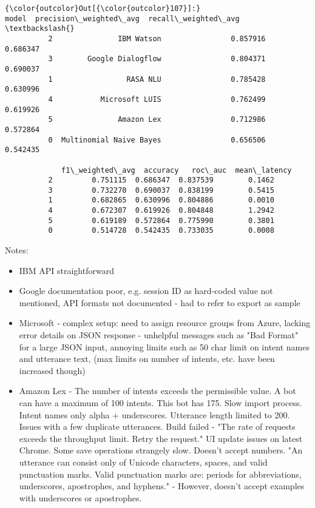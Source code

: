 \documentclass[11pt]{article}
\providecommand{\tightlist}{%
      \setlength{\itemsep}{0pt}\setlength{\parskip}{0pt}}
\begin{document}
\begin{Verbatim}[commandchars=\\\{\}]
{\color{outcolor}Out[{\color{outcolor}107}]:}                      model  precision\_weighted\_avg  recall\_weighted\_avg  \textbackslash{}
          2               IBM Watson                0.857916             0.686347   
          3        Google Dialogflow                0.804371             0.690037   
          1                 RASA NLU                0.785428             0.630996   
          4           Microsoft LUIS                0.762499             0.619926   
          5               Amazon Lex                0.712986             0.572864   
          0  Multinomial Naive Bayes                0.656506             0.542435   
          
             f1\_weighted\_avg  accuracy   roc\_auc  mean\_latency  
          2         0.751115  0.686347  0.837539        0.1462  
          3         0.732270  0.690037  0.838199        0.5415  
          1         0.682865  0.630996  0.804886        0.0010  
          4         0.672307  0.619926  0.804848        1.2942  
          5         0.619189  0.572864  0.775990        0.3801  
          0         0.514728  0.542435  0.733035        0.0008  
\end{Verbatim}
            
    Notes:

\begin{itemize}
\tightlist
\item
  IBM API straightforward
\item
  Google documentation poor, e.g. session ID as hard-coded value not
  mentioned, API formats not documented - had to refer to export as
  sample
\item
  Microsoft - complex setup: need to assign resource groups from Azure,
  lacking error details on JSON response - unhelpful messages such as
  "Bad Format" for a large JSON input, annoying limits such as 50 char
  limit on intent names and utterance text, (max limits on number of
  intents, etc. have been increased though)
\item
  Amazon Lex - The number of intents exceeds the permissible value. A
  bot can have a maximum of 100 intents. This bot has 175. Slow import
  process. Intent names only alpha + underscores. Utterance length
  limited to 200. Issues with a few duplicate utterances. Build failed -
  "The rate of requests exceeds the throughput limit. Retry the
  request." UI update issues on latest Chrome. Some save operations
  strangely slow. Doesn't accept numbers. "An utterance can consist only
  of Unicode characters, spaces, and valid punctuation marks. Valid
  punctuation marks are: periods for abbreviations, underscores,
  apostrophes, and hyphens." - However, doesn't accept examples with
  underscores or apostrophes.
\end{itemize}


    
    
    
    
\end{document}
